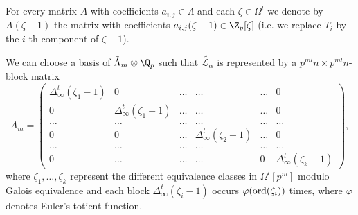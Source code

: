 For every matrix $A$ with coefficients ${a_{i,j} \in \Lambda}$ and each ${\zeta \in \Omega^l}$ we denote by $A(\zeta - 1)$ the matrix with coefficients ${a_{i,j}(\zeta-1) \in \Z_p[\zeta]}$ (i.e. we replace $T_i$ by the $i$-th component of $\zeta - 1$). 
\begin{lemma} \label{lemma:Am} 
	We can choose a basis of $\tilde{\Lambda}_m\otimes \Q_p$ such that $\tilde{\mathcal{L}_\alpha}$ is represented by a $p^{ml}n\times p^{ml}n$-block matrix
	\[A_m= \begin{pmatrix}
		\Delta^t_\infty(\zeta_1-1)&0&\dots &\dots&\dots&0\\
		0& \Delta^t_\infty(\zeta_1-1)&\dots &\dots&\dots&0\\
		\dots&\dots&\dots&\dots&\dots&\dots\\
		0&0&\dots&\Delta^t_\infty(\zeta_2-1)&\dots&0\\
		\dots&\dots&\dots&\dots&\dots&\dots\\
		0&\dots&\dots&\dots&0&\Delta^t_\infty(\zeta_{k}-1)
	\end{pmatrix},\]
	where $\zeta_1,\ldots ,\zeta_k$ represent the different equivalence classes in $\Omega^l[p^m]$ modulo Galois equivalence and each block $\Delta_\infty^t(\zeta_i-1)$ occurs $\varphi(\textup{ord}(\zeta_i))$ times, where $\varphi$ denotes Euler's totient function. 
\end{lemma}
